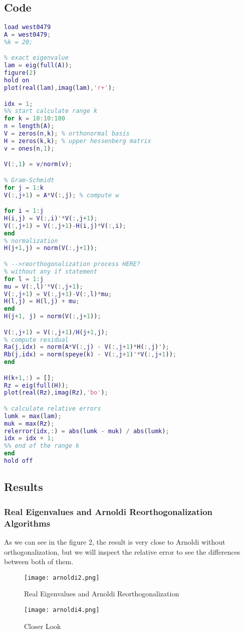 \documentclass{article}
\begin{document}
\subsection{Code}
\begin{lstlisting}[language=Matlab, caption=Arnoldi-with-re-orthogonalization.m]
load west0479
A = west0479;
%k = 20;

% exact eigenvalue
lam = eig(full(A));
figure(2)
hold on
plot(real(lam),imag(lam),'r+');

idx = 1;
%% start calculate range k
for k = 10:10:100
n = length(A);
V = zeros(n,k); % orthonormal basis
H = zeros(k,k); % upper hessenberg matrix
v = ones(n,1);

V(:,1) = v/norm(v);

% Gram-Schmidt
for j = 1:k
V(:,j+1) = A*V(:,j); % compute w

for i = 1:j
H(i,j) = V(:,i)'*V(:,j+1);
V(:,j+1) = V(:,j+1)-H(i,j)*V(:,i);
end
% normalization
H(j+1,j) = norm(V(:,j+1));

% -->reorthogonalization process HERE?
% without any if statement
for l = 1:j
mu = V(:,l)'*V(:,j+1);
V(:,j+1) = V(:,j+1)-V(:,l)*mu;
H(l,j) = H(l,j) + mu;
end
H(j+1, j) = norm(V(:,j+1));

V(:,j+1) = V(:,j+1)/H(j+1,j);
% compute residual
Ra(j,idx) = norm(A*V(:,j) - V(:,j+1)*H(:,j)');
Rb(j,idx) = norm(speye(k) - V(:,j+1)'*V(:,j+1));
end

H(k+1,:) = []; 
Rz = eig(full(H));
plot(real(Rz),imag(Rz),'bo');

% calculate relative errors
lumk = max(lam);
muk = max(Rz);
relerror(idx,:) = abs(lumk - muk) / abs(lumk);
idx = idx + 1;
%% end of the range k
end
hold off
\end{lstlisting}
\subsection{Results}
\subsubsection{Real Eigenvalues and Arnoldi Reorthogonalization Algorithms}
\begin{flushleft}
As we can see in the figure 2, the result is very close to Arnoldi without orthogonalization, but we will inspect the relative error to see the differences between both of them.
\end{flushleft}
\begin{figure}[H]
    \centering
    \texttt{[image: arnoldi2.png]}
    \caption{Real Eigenvalues and Arnoldi Reorthogonalization}
    \texttt{[image: arnoldi4.png]}
    \caption{Closer Look}
    \label{fig:arnoldi}
\end{figure}
\end{document}
